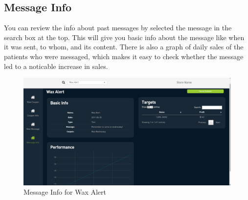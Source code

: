 \documentclass[]{book}
\theoremstyle{definition}
\theoremstyle{definition}
\theoremstyle{definition}
\theoremstyle{remark}
\begin{document}
\subsection{Message Info}\label{message-info}

You can review the info about past messages by selected the message in
the search box at the top. This will give you basic info about the
message like when it was sent, to whom, and its content. There is also a
graph of daily sales of the patients who were messaged, which makes it
easy to check whether the message led to a noticable increase in sales.

\begin{figure}
\centering
\includegraphics{images/C7.png}
\caption{Message Info for Wax Alert}
\end{figure}
\end{document}
